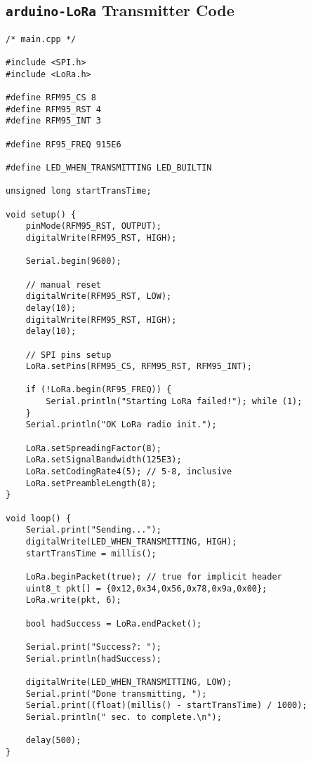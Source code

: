 
\subsection*{\texttt{arduino-LoRa} Transmitter Code}
\begin{Verbatim}[fontsize=\footnotesize]
/* main.cpp */

#include <SPI.h>
#include <LoRa.h>

#define RFM95_CS 8
#define RFM95_RST 4
#define RFM95_INT 3

#define RF95_FREQ 915E6

#define LED_WHEN_TRANSMITTING LED_BUILTIN

unsigned long startTransTime;

void setup() {
	pinMode(RFM95_RST, OUTPUT);
	digitalWrite(RFM95_RST, HIGH);

	Serial.begin(9600);

	// manual reset
	digitalWrite(RFM95_RST, LOW);
	delay(10);
	digitalWrite(RFM95_RST, HIGH);
	delay(10);

	// SPI pins setup
	LoRa.setPins(RFM95_CS, RFM95_RST, RFM95_INT);

	if (!LoRa.begin(RF95_FREQ)) {
    	Serial.println("Starting LoRa failed!"); while (1);
  	}
	Serial.println("OK LoRa radio init.");

	LoRa.setSpreadingFactor(8);
	LoRa.setSignalBandwidth(125E3);
	LoRa.setCodingRate4(5); // 5-8, inclusive
	LoRa.setPreambleLength(8);
}

void loop() {
	Serial.print("Sending...");
	digitalWrite(LED_WHEN_TRANSMITTING, HIGH);
	startTransTime = millis();

	LoRa.beginPacket(true); // true for implicit header
	uint8_t pkt[] = {0x12,0x34,0x56,0x78,0x9a,0x00};
	LoRa.write(pkt, 6);

	bool hadSuccess = LoRa.endPacket();

	Serial.print("Success?: ");
	Serial.println(hadSuccess);

	digitalWrite(LED_WHEN_TRANSMITTING, LOW);
	Serial.print("Done transmitting, ");
	Serial.print((float)(millis() - startTransTime) / 1000);
	Serial.println(" sec. to complete.\n");

	delay(500);
}
\end{Verbatim}